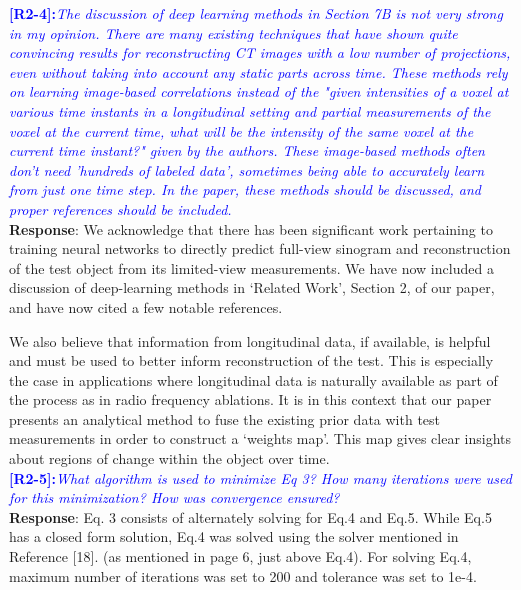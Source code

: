\documentclass[11pt]{article}
\begin{document}
\vspace{0.5cm}\textcolor{blue}{\textbf{[R2-4]:}\textit{The discussion of deep learning methods in Section 7B is not very strong in my opinion. There are many existing techniques that have shown quite convincing results for reconstructing CT images with a low number of projections, even without taking into account any static parts across time. These methods rely on learning image-based correlations instead of the "given intensities of a voxel at various time instants in a longitudinal setting and partial measurements of the voxel at the current time, what will be the intensity of the same voxel at the current time instant?" given by the authors. These image-based methods often don't need 'hundreds of labeled data', sometimes being able to accurately learn from just one time step. In the paper, these methods should be discussed, and proper references should be included.}}\\

\textbf{Response}: We acknowledge that there has been significant work pertaining to training neural networks to directly predict full-view sinogram and reconstruction of the test object from its limited-view measurements. We have now included a discussion of deep-learning methods in `Related Work', Section 2, of our paper, and have now cited a few notable references.

We also believe that information from longitudinal data, if available, is helpful and must be used to better inform reconstruction of the test. This is especially the case in applications where longitudinal data is naturally available as part of the process as in radio frequency ablations. It is in this context that our paper presents an analytical method to fuse the existing prior data with test measurements in order to construct a `weights map'. This map gives clear insights about regions of change within the object over time.\\



\vspace{0.5cm}\textcolor{blue}{\textbf{[R2-5]:}\textit{What algorithm is used to minimize Eq 3? How many iterations were used for this minimization? How was convergence ensured?}}\\

\textbf{Response}: Eq. 3 consists of alternately solving for Eq.4 and Eq.5. While Eq.5 has a closed form solution, Eq.4 was solved using the solver mentioned in Reference [18]. (as mentioned in page 6, just above Eq.4). 
For solving Eq.4, maximum number of iterations was set to 200 and tolerance was set to 1e-4.
\end{document}
